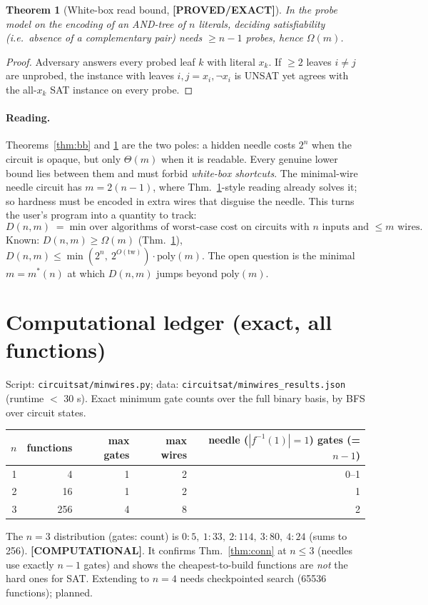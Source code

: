 \documentclass[11pt]{article}
\newtheorem{theorem}{Theorem}\newtheorem{lemma}[theorem]{Lemma}
\newcommand{\status}[1]{\textbf{[#1]}}
\begin{document}
\begin{theorem}[White-box read bound, \status{PROVED/EXACT}]\label{thm:wb}
In the probe model on the encoding of an AND-tree of $n$ literals, deciding satisfiability
(i.e.\ absence of a complementary pair) needs $\ge n-1$ probes, hence $\Omega(m)$.
\end{theorem}
\begin{proof} Adversary answers every probed leaf $k$ with literal $x_k$. If $\ge2$ leaves
$i\ne j$ are unprobed, the instance with leaves $i,j=x_i,\neg x_i$ is UNSAT yet agrees
with the all-$x_k$ SAT instance on every probe. \end{proof}

\paragraph{Reading.} Theorems~\ref{thm:bb} and \ref{thm:wb} are the two poles: a hidden
needle costs $2^n$ when the circuit is opaque, but only $\Theta(m)$ when it is readable.
Every genuine lower bound lies between them and must forbid \emph{white-box shortcuts}.
The minimal-wire needle circuit has $m=2(n-1)$, where Thm.~\ref{thm:wb}-style reading
already solves it; so hardness must be encoded in extra wires that disguise the needle.
This turns the user's program into a quantity to track:
\[
  D(n,m)\;=\;\text{min over algorithms of worst-case cost on circuits with $n$ inputs and $\le m$ wires.}
\]
Known: $D(n,m)\ge\Omega(m)$ (Thm.~\ref{thm:wb}), $D(n,m)\le \min(2^n,\ 2^{O(\mathrm{tw})})\cdot\mathrm{poly}(m)$.
The open question is the minimal $m=m^*(n)$ at which $D(n,m)$ jumps beyond $\mathrm{poly}(m)$.

\section{Computational ledger (exact, all functions)}
Script: \texttt{circuitsat/minwires.py}; data: \texttt{circuitsat/minwires\_results.json}
(runtime $<$ 30 s). Exact minimum gate counts over the full binary basis, by BFS over circuit states.
\begin{center}\begin{tabular}{@{}rrrrr@{}}\toprule
$n$ & functions & max gates & max wires & needle ($|f^{-1}(1)|=1$) gates (=$n-1$) \\\midrule
1 & 4   & 1 & 2 & 0--1 \\
2 & 16  & 1 & 2 & 1 \\
3 & 256 & 4 & 8 & 2 \\\bottomrule\end{tabular}\end{center}
The $n=3$ distribution (gates: count) is $0{:}5,\ 1{:}33,\ 2{:}114,\ 3{:}80,\ 4{:}24$ (sums to 256).
\status{COMPUTATIONAL}. It confirms Thm.~\ref{thm:conn} at $n\le 3$ (needles use exactly $n-1$ gates) and
shows the cheapest-to-build functions are \emph{not} the hard ones for SAT. Extending to $n=4$ needs
checkpointed search (65536 functions); planned.
\end{document}
